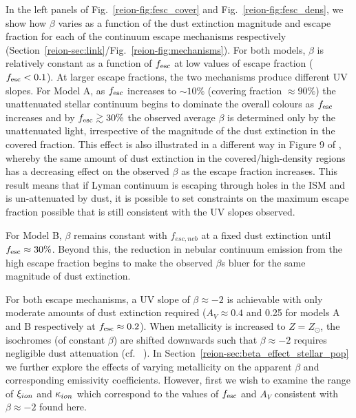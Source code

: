 In the left panels of Fig.~\ref{reion-fig:fesc_cover} and Fig.~\ref{reion-fig:fesc_dens}, we show how $\beta$ varies as a function of the dust extinction magnitude and escape fraction for each of the continuum escape mechanisms respectively (Section~\ref{reion-sec:link}/Fig.~\ref{reion-fig:mechanisms}). For both models, $\beta$ is relatively constant as a function of $f_{\rm{esc}}$ at low values of escape fraction ($f_{\rm{esc}} < 0.1$). At larger escape fractions, the two mechanisms produce different UV slopes. For Model A, as $f_{\rm{esc}}$ increases to $\sim10\%$ (covering fraction $\approx 90\%$) the unattenuated stellar continuum begins to dominate the overall colours as $f_{\rm{esc}}$ increases and by $f_{\rm{esc}} \gtrsim 30\%$ the observed average $\beta$ is determined only by the unattenuated light, irrespective of the magnitude of the dust extinction in the covered fraction. This effect is also illustrated in a different way in Figure 9 of \citet{Zackrisson:2013iz}, whereby the same amount of dust extinction in the covered/high-density regions has a decreasing effect on the observed $\beta$ as the escape fraction increases. This result means that if Lyman continuum is escaping through holes in the ISM and is un-attenuated by dust, it is possible to set constraints on the maximum escape fraction possible that is still consistent with the UV slopes observed.

For Model B, $\beta$ remains constant with $f_{esc,neb}$ at a fixed dust extinction until $f_{\rm{esc}} \approx 30\%$. Beyond this, the reduction in nebular continuum emission from the high escape fraction begins to make the observed $\beta$s bluer for the same magnitude of dust extinction.

For both escape mechanisms, a UV slope of $\beta \approx -2$ is achievable with only moderate amounts of dust extinction required ($A_{V} \approx 0.4$ and 0.25 for models A and B respectively at $f_{\rm{esc}}\approx 0.2$). When metallicity is increased to $Z = Z_{\odot}$, the isochromes (of constant $\beta$) are shifted downwards such that $\beta \approx -2$ requires negligible dust attenuation (cf. \citeauthor{Robertson:2013ji}~\citeyear{Robertson:2013ji}). In Section~\ref{reion-sec:beta_effect_stellar_pop} we further explore the effects of varying metallicity on the apparent $\beta$ and corresponding emissivity coefficients. However, first we wish to examine the range of $\xi_{\lowercase{ion}}$ and $\kappa_{\lowercase{ion}}$ which correspond to the values of $f_{\rm{esc}}$ and $A_{V}$ consistent with $\beta \approx -2$ found here.


